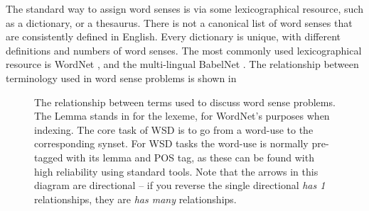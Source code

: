 \documentclass[12pt,parskip]{komatufte}
\begin{document}
The standard way to assign word senses is via some lexicographical resource, such as a dictionary, or a thesaurus.
There is not a canonical list of word senses that are consistently defined in English.
Every dictionary is unique, with different definitions and numbers of word senses.
The most commonly used lexicographical resource is WordNet , and the multi-lingual  BabelNet .
The relationship between terminology used in word sense problems is shown in 


\begin{figure}
	\caption{The relationship between terms used to discuss word sense problems.
		The Lemma stands in for the lexeme, for WordNet's purposes when indexing.
		The core task of WSD is to go from a word-use to the corresponding synset.
		For WSD tasks the word-use is normally pre-tagged with its lemma and POS tag,
		as these can be found with high reliability using standard tools.
		Note that the arrows in this diagram are directional -- if you reverse the single directional \emph{has 1} relationships, they are \emph{has many} relationships.
	}
	\label{fig:wordsenseterms}

\end{figure}
\end{document}
